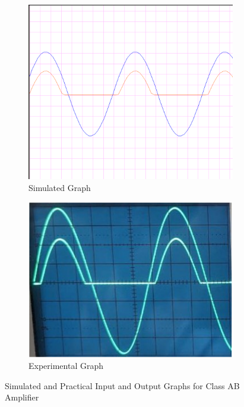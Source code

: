 \documentclass[12pt]{article}
\begin{document}
\begin{figure}[h!]
    \centering
    \begin{subfigure}{0.55\textwidth}
        \includegraphics[width=\textwidth]{Class_C_Graph.png}
        \caption{Simulated Graph}
    \end{subfigure}
    \begin{subfigure}{0.55\textwidth}
        \includegraphics[width=\textwidth]{Class_C_Practical.png}
        \caption{Experimental Graph}
    \end{subfigure}
    \caption{Simulated and Practical Input and Output Graphs for Class AB Amplifier}
\end{figure}
\end{document}
